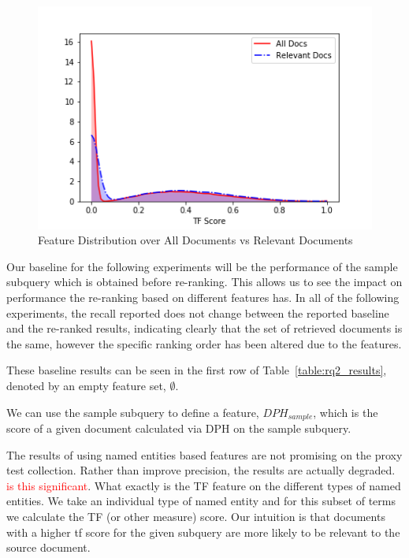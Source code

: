 \documentclass{mpaper}
\newcommand{\remove}[1]{\textcolor{red}{#1}}
\begin{document}
\begin{figure}[H]
\begin{center}
\includegraphics[scale=0.5]{locs.png}
\end{center}
\caption{\label{fig:distribution} Feature Distribution over All Documents vs Relevant Documents}
\end{figure}

Our baseline for the following experiments will be the performance of the sample subquery which is obtained before re-ranking. This allows us to see the impact on performance the re-ranking based on different features has.
In all of the following experiments, the recall reported does not change between the reported baseline and the re-ranked results, indicating clearly that the set of retrieved documents is the same, however the specific ranking order has been altered due to the features.

These baseline results can be seen in the first row of Table~\ref{table:rq2_results}, denoted by an empty feature set, $\emptyset$.

We can use the sample subquery to define a feature, $DPH_{sample}$, which is the score of a given document calculated via DPH on the sample subquery.

The results of using named entities based features are not promising on the proxy test collection.
Rather than improve precision, the results are actually degraded. \remove{is this significant}.
What exactly is the TF feature on the different types of named entities.
We take an individual type of named entity and for this subset of terms we calculate the TF (or other measure) score.
Our intuition is that documents with a higher tf score for the given subquery are more likely to be relevant to the source document.
\end{document}

